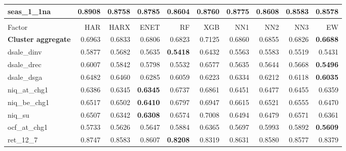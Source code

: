 \begin{longtable}{>{\raggedright\arraybackslash}p{2.6cm}rrrrrrrrr}
seas\_1\_1na & 0.8908 & \cellcolor{blue!10}0.8758 & \cellcolor{blue!10}0.8785 & \cellcolor{blue!10}0.8604 & \cellcolor{blue!10}0.8760 & \cellcolor{blue!10}0.8775 & \cellcolor{blue!10}0.8608 & \cellcolor{blue!10}0.8583 & \textbf{\cellcolor{blue!10}0.8578} \\
\hline
\multicolumn{10}{@{}l}{\textit{Panel G. Profit Growth}} \\
\hline
Factor & HAR & HARX & ENET & RF & XGB & NN1 & NN2 & NN3 & EW \\
\hline
\textbf{Cluster aggregate} & 0.6963 & \cellcolor{blue!10}0.6833 & \cellcolor{blue!10}0.6806 & \cellcolor{blue!10}0.6823 & 0.7125 & \cellcolor{blue!10}0.6860 & \cellcolor{blue!10}0.6855 & \cellcolor{blue!10}0.6826 & \textbf{\cellcolor{blue!10}0.6688} \\
dsale\_dinv & 0.5877 & \cellcolor{blue!10}0.5682 & \cellcolor{blue!10}0.5635 & \textbf{\cellcolor{blue!10}0.5418} & 0.6432 & \cellcolor{blue!10}0.5563 & \cellcolor{blue!10}0.5583 & \cellcolor{blue!10}0.5519 & \cellcolor{blue!10}0.5431 \\
dsale\_drec & 0.6007 & \cellcolor{blue!10}0.5842 & \cellcolor{blue!10}0.5798 & \cellcolor{blue!10}0.5532 & 0.6577 & \cellcolor{blue!10}0.5635 & \cellcolor{blue!10}0.5644 & \cellcolor{blue!10}0.5668 & \textbf{\cellcolor{blue!10}0.5496} \\
dsale\_dsga & 0.6482 & \cellcolor{blue!10}0.6460 & \cellcolor{blue!10}0.6285 & \cellcolor{blue!10}0.6059 & \cellcolor{blue!10}0.6223 & \cellcolor{blue!10}0.6334 & \cellcolor{blue!10}0.6212 & \cellcolor{blue!10}0.6118 & \textbf{\cellcolor{blue!10}0.6035} \\
niq\_at\_chg1 & 0.6386 & \cellcolor{blue!10}0.6345 & \textbf{\cellcolor{blue!10}0.6345} & 0.6737 & 0.6861 & 0.6451 & 0.6477 & 0.6455 & \cellcolor{blue!10}0.6359 \\
niq\_be\_chg1 & 0.6517 & \cellcolor{blue!10}0.6502 & \textbf{\cellcolor{blue!10}0.6410} & 0.6797 & 0.6947 & 0.6615 & 0.6521 & 0.6555 & \cellcolor{blue!10}0.6470 \\
niq\_su & 0.6507 & \cellcolor{blue!10}0.6342 & \textbf{\cellcolor{blue!10}0.6308} & 0.6574 & 0.7008 & \cellcolor{blue!10}0.6494 & \cellcolor{blue!10}0.6479 & 0.6571 & \cellcolor{blue!10}0.6361 \\
ocf\_at\_chg1 & 0.5733 & \cellcolor{blue!10}0.5626 & \cellcolor{blue!10}0.5647 & 0.5884 & 0.6365 & \cellcolor{blue!10}0.5697 & 0.5993 & 0.5892 & \textbf{\cellcolor{blue!10}0.5609} \\
ret\_12\_7 & 0.8747 & \cellcolor{blue!10}0.8583 & \cellcolor{blue!10}0.8607 & \textbf{\cellcolor{blue!10}0.8208} & \cellcolor{blue!10}0.8319 & \cellcolor{blue!10}0.8631 & \cellcolor{blue!10}0.8580 & \cellcolor{blue!10}0.8577 & \cellcolor{blue!10}0.8379 \\

\end{longtable}
